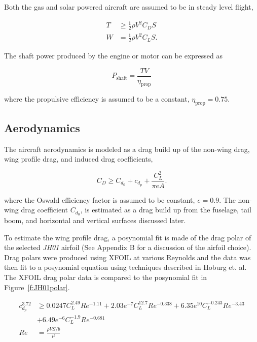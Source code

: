 Both the gas and solar powered aircraft are assumed to be in steady level flight,\cite{hoburgthesis}

\begin{align}
    \label{e:slfthrust}
    T &\geq \frac{1}{2} \rho V^2 C_D S\\
    \label{e:slfweight}
    W &= \frac{1}{2} \rho V^2 C_L S. 
\end{align}

The shaft power produced by the engine or motor can be expressed as  

\begin{equation}
    \label{e:slfpower}
    P_{\text{shaft}} = \frac{TV}{\eta_{\text{prop}}}
    \end{equation}

    where the propulsive efficiency is assumed to be a constant, $\eta_{\text{prop}} = 0.75$. 

\subsection{Aerodynamics}

The aircraft aerodynamics is modeled as a drag build up of the non-wing drag, wing profile drag, and induced drag coefficients, 

\begin{equation}
    \label{e:aerodragb}
    C_D \geq C_{d_0} + c_{d_p} + \frac{C_L^2}{\pi e A}.
    \end{equation}

where the Oswald efficiency factor is assumed to be constant, $e=0.9$. 
The non-wing drag coefficient $C_{d_0}$, is estimated as a drag build up from the fuselage, tail boom, and horizontal and vertical surfaces discussed later.
    
    To estimate the wing profile drag, a posynomial fit is made of the drag polar of the selected \emph{JH01} airfoil (See Appendix B for a discussion of the airfoil choice). 
    Drag polars were produced using XFOIL\cite{xfoil} at various Reynolds and the data was then fit to a posynomial equation using techniques described in Hoburg et. al.\cite{fitting}
    The XFOIL drag polar data is compared to the posynomial fit in Figure~\ref{f:JH01polar}.

    \begin{align}
        \label{e:aerodragprof}
        c_{d_p}^{3.72} &\geq 0.0247C_L^{2.49}Re^{-1.11} + 2.03e^{-7}C_L^{12.7}Re^{-0.338} + 6.35e^{10}C_L^{-0.243}Re^{-3.43} \nonumber \\
                       &+ 6.49e^{-6}C_L^{-1.9}Re^{-0.681} \\
        Re &= \frac{\rho V S/b}{\mu}
    \end{align}

